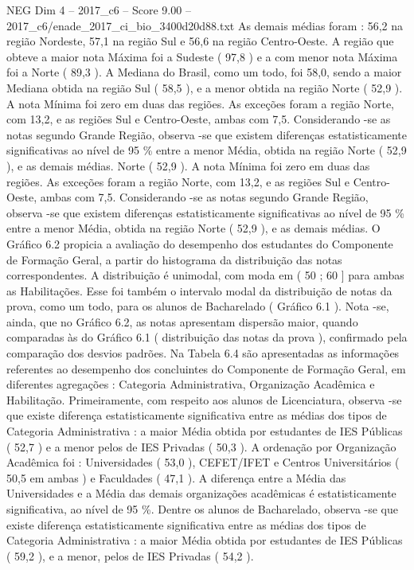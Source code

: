 \begin{textsample}{NEG Dim 4 – 2017\_c6 – Score 9.00 – 2017\_c6/enade\_2017\_ci\_bio\_3400d20d88.txt}
As demais médias foram : 56,2 na região Nordeste, 57,1 na região Sul e 56,6 na região Centro-Oeste.
A região que obteve a maior nota Máxima foi a Sudeste ( 97,8 ) e a com menor nota Máxima foi a Norte ( 89,3 ).
A Mediana do Brasil, como um todo, foi 58,0, sendo a maior Mediana obtida na região Sul ( 58,5 ), e a menor obtida na região Norte ( 52,9 ).
A nota Mínima foi zero em duas das regiões.
As exceções foram a região Norte, com 13,2, e as regiões Sul e Centro-Oeste, ambas com 7,5.
Considerando -se as notas segundo Grande Região, observa -se que existem diferenças estatisticamente significativas ao nível de 95 \% entre a menor Média, obtida na região Norte ( 52,9 ), e as demais médias.
Norte ( 52,9 ).
A nota Mínima foi zero em duas das regiões.
As exceções foram a região Norte, com 13,2, e as regiões Sul e Centro-Oeste, ambas com 7,5.
Considerando -se as notas segundo Grande Região, observa -se que existem diferenças estatisticamente significativas ao nível de 95 \% entre a menor Média, obtida na região Norte ( 52,9 ), e as demais médias.
O Gráfico 6.2 propicia a avaliação do desempenho dos estudantes do Componente de Formação Geral, a partir do histograma da distribuição das notas correspondentes.
A distribuição é unimodal, com moda em ( 50 ; 60 ] para ambas as Habilitações.
Esse foi também o intervalo modal da distribuição de notas da prova, como um todo, para os alunos de Bacharelado ( Gráfico 6.1 ).
Nota -se, ainda, que no Gráfico 6.2, as notas apresentam dispersão maior, quando comparadas às do Gráfico 6.1 ( distribuição das notas da prova ), confirmado pela comparação dos desvios padrões.
Na Tabela 6.4 são apresentadas as informações referentes ao desempenho dos concluintes do Componente de Formação Geral, em diferentes agregações : Categoria Administrativa, Organização Acadêmica e Habilitação.
Primeiramente, com respeito aos alunos de Licenciatura, observa -se que existe diferença estatisticamente significativa entre as médias dos tipos de Categoria Administrativa : a maior Média obtida por estudantes de IES Públicas ( 52,7 ) e a menor pelos de IES Privadas ( 50,3 ).
A ordenação por Organização Acadêmica foi : Universidades ( 53,0 ), CEFET/IFET e Centros Universitários ( 50,5 em ambas ) e Faculdades ( 47,1 ).
A diferença entre a Média das Universidades e a Média das demais organizações acadêmicas é estatisticamente significativa, ao nível de 95 \%.
Dentre os alunos de Bacharelado, observa -se que existe diferença estatisticamente significativa entre as médias dos tipos de Categoria Administrativa : a maior Média obtida por estudantes de IES Públicas ( 59,2 ), e a menor, pelos de IES Privadas ( 54,2 ).

\end{textsample}
